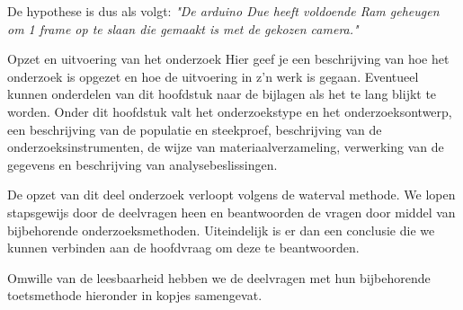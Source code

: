 \documentclass{article}
\begin{document}
De hypothese is dus als volgt: \textit{"De arduino Due heeft voldoende Ram geheugen om 1 frame op te slaan die gemaakt is met de gekozen camera."}

Opzet en uitvoering van het onderzoek
Hier geef je een beschrijving van hoe het onderzoek is opgezet en hoe de uitvoering in z’n werk is gegaan. Eventueel kunnen onderdelen van dit hoofdstuk naar de bijlagen als het te lang blijkt te worden. Onder dit hoofdstuk valt het onderzoekstype en het onderzoeksontwerp, een beschrijving van de populatie en steekproef, beschrijving van de onderzoeksinstrumenten, de wijze van materiaalverzameling, verwerking van de gegevens en beschrijving van analysebeslissingen.

De opzet van dit deel onderzoek verloopt volgens de waterval methode. We lopen stapsgewijs door de deelvragen heen en beantwoorden de vragen door middel van bijbehorende onderzoeksmethoden. Uiteindelijk is er dan een conclusie die we kunnen verbinden aan de hoofdvraag om deze te beantwoorden.

Omwille van de leesbaarheid hebben we de deelvragen met hun bijbehorende toetsmethode hieronder in kopjes samengevat.
\end{document}
